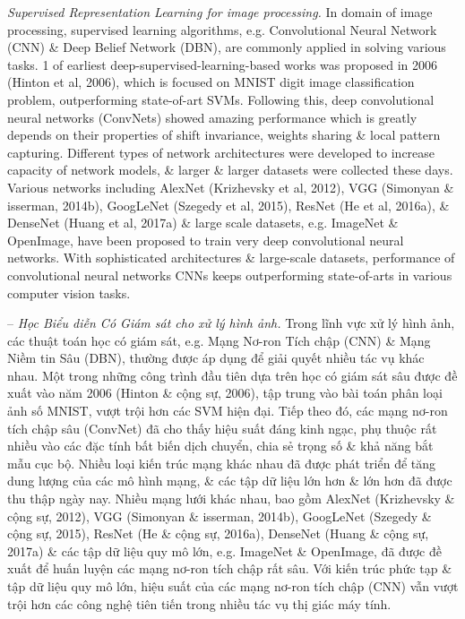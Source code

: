 \documentclass{article}
\begin{document}
\begin{itemize}
\begin{itemize}
\begin{itemize}
            {\it Supervised Representation Learning for image processing.} In domain of image processing, supervised learning algorithms, e.g. Convolutional Neural Network (CNN) \& Deep Belief Network (DBN), are commonly applied in solving various tasks. 1 of earliest deep-supervised-learning-based works was proposed in 2006 (Hinton et al, 2006), which is focused on MNIST digit image classification problem, outperforming state-of-art SVMs. Following this, deep convolutional neural networks (ConvNets) showed amazing performance which is greatly depends on their properties of shift invariance, weights sharing \& local pattern capturing. Different types of network architectures were developed to increase capacity of network models, \& larger \& larger datasets were collected these days. Various networks including AlexNet (Krizhevsky et al, 2012), VGG (Simonyan \& isserman, 2014b), GoogLeNet (Szegedy et al, 2015), ResNet (He et al, 2016a), \& DenseNet (Huang et al, 2017a) \& large scale datasets, e.g. ImageNet \& OpenImage, have been proposed to train very deep convolutional neural networks. With sophisticated architectures \& large-scale datasets, performance of convolutional neural networks CNNs keeps outperforming state-of-arts in various computer vision tasks.

            -- {\it Học Biểu diễn Có Giám sát cho xử lý hình ảnh.} Trong lĩnh vực xử lý hình ảnh, các thuật toán học có giám sát, e.g. Mạng Nơ-ron Tích chập (CNN) \& Mạng Niềm tin Sâu (DBN), thường được áp dụng để giải quyết nhiều tác vụ khác nhau. Một trong những công trình đầu tiên dựa trên học có giám sát sâu được đề xuất vào năm 2006 (Hinton \& cộng sự, 2006), tập trung vào bài toán phân loại ảnh số MNIST, vượt trội hơn các SVM hiện đại. Tiếp theo đó, các mạng nơ-ron tích chập sâu (ConvNet) đã cho thấy hiệu suất đáng kinh ngạc, phụ thuộc rất nhiều vào các đặc tính bất biến dịch chuyển, chia sẻ trọng số \& khả năng bắt mẫu cục bộ. Nhiều loại kiến trúc mạng khác nhau đã được phát triển để tăng dung lượng của các mô hình mạng, \& các tập dữ liệu lớn hơn \& lớn hơn đã được thu thập ngày nay. Nhiều mạng lưới khác nhau, bao gồm AlexNet (Krizhevsky \& cộng sự, 2012), VGG (Simonyan \& isserman, 2014b), GoogLeNet (Szegedy \& cộng sự, 2015), ResNet (He \& cộng sự, 2016a), DenseNet (Huang \& cộng sự, 2017a) \& các tập dữ liệu quy mô lớn, e.g. ImageNet \& OpenImage, đã được đề xuất để huấn luyện các mạng nơ-ron tích chập rất sâu. Với kiến trúc phức tạp \& tập dữ liệu quy mô lớn, hiệu suất của các mạng nơ-ron tích chập (CNN) vẫn vượt trội hơn các công nghệ tiên tiến trong nhiều tác vụ thị giác máy tính.


\end{itemize}
\end{itemize}
\end{itemize}
\end{document}
